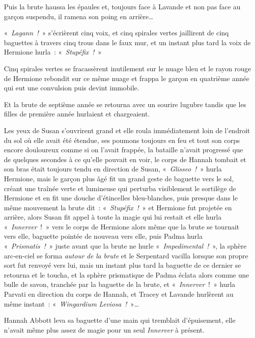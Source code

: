 Puis la brute haussa les épaules et, toujours face à Lavande et non pas face au garçon suspendu, il ramena son poing en arrière…

«~\emph{Lagann~!}~» s'écrièrent cinq voix, et cinq spirales vertes jaillirent de cinq baguettes à travers cinq trous dans le faux mur, et un instant plus tard la voix de Hermione hurla~: «~\emph{Stupéfix~!}~»

Cinq spirales vertes se fracassèrent inutilement sur le nuage bleu et le rayon rouge de Hermione rebondit sur ce même nuage et frappa le garçon en quatrième année qui eut une convulsion puis devint immobile.

Et la brute de septième année se retourna avec un sourire lugubre tandis que les filles de première année hurlaient et chargeaient.

\later

Les yeux de Susan s'ouvrirent grand et elle roula immédiatement loin de l'endroit du sol où elle avait été étendue, ses poumons toujours en feu et tout son corps encore douloureux comme si on l'avait frappée, la bataille n'avait progressé que de quelques secondes à ce qu'elle pouvait en voir, le corps de Hannah tombait et son bras était toujours tendu en direction de Susan, «~\emph{Glisseo~!}~» hurla Hermione, mais le garçon plus âgé fit un grand geste de baguette vers le sol, créant une traînée verte et lumineuse qui perturba visiblement le sortilège de Hermione et en fit une douche d'étincelles bleu-blanches, puis presque dans le même mouvement la brute dit~: «~\emph{Stupéfix~!}~» et Hermione fut projetée en arrière, alors Susan fit appel à toute la magie qui lui restait et elle hurla «~\emph{Innerver}~!~»
vers le corps de Hermione alors même que la brute se tournait vers elle, baguette pointée de nouveau vers elle, puis Padma hurla «~\emph{Prismatis~!}~» juste avant que la brute ne hurle «~\emph{Impedimental~!}~», la sphère arc-en-ciel se forma \emph{autour de la brute} et le Serpentard vacilla lorsque son propre sort fut renvoyé vers lui, mais un instant plus tard la baguette de ce dernier se retourna et le toucha, et la sphère prismatique de Padma éclata alors comme une bulle de savon, tranchée par la baguette de la brute, et «~\emph{Innerver}~!~»
hurla Parvati en direction du corps de Hannah, et Tracey et Lavande hurlèrent au même instant~: «~\emph{Wingardium Leviosa~!}~»…

\later

Hannah Abbott leva sa baguette d'une main qui tremblait d'épuisement, elle n'avait même plus assez de magie pour un seul \emph{Innerver} à présent.

